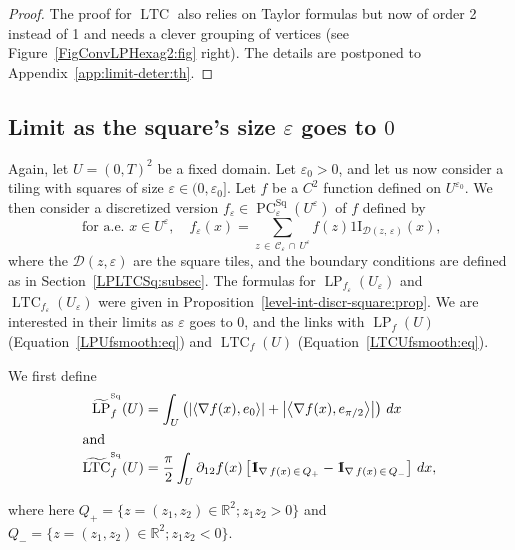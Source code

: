 \documentclass[10pt]{amsart}
\theoremstyle{definition}\newtheorem{defi}[theo]{Definition}\newtheorem{rema}[theo]{Remark}\newtheorem{exam}[theo]{Example}\newtheorem{exem}[theo]{Example}\newtheorem{nota}[theo]{Notation}
\newcommand{\R}{\mathbb{R}}
\newcommand{\ind}{{1\!\!\mathrm{I}}}
\newcommand{\eps}{\varepsilon}
\DeclareMathOperator{\LTC}{LTC}
\DeclareMathOperator{\LP}{LP}
\DeclareMathOperator{\PC}{PC}
\DeclareMathOperator{\Sq}{Sq}
\newcommand{\tLP}{\widetilde{\mathrm{LP}}}
\newcommand{\tLTC}{\widetilde{\mathrm{LTC}}}
\newcommand{\calC}{\mathcal{C}}
\newcommand{\calD}{\mathcal{D}}
\begin{document}
\begin{proof}

The proof for $\LTC$ also relies on Taylor formulas but now of order 2 instead of 1 and needs a clever grouping of vertices (see Figure~\ref{FigConvLPHexag2:fig} right). The details are postponed to Appendix~\ref{app:limit-deter:th}.
\end{proof}

\subsection{Limit as the square's size \texorpdfstring{$\eps$}{eps} goes to \texorpdfstring{$0$}{0}}

Again, let $U=(0,T)^2$ be a fixed domain. Let $\eps_0>0$, and let us now consider a tiling with squares of size $\eps \in (0,\eps_0]$. Let $f$ be a $C^2$ function defined on $U^{\eps_0}$. We then consider a discretized version $f_\eps\in \PC^{\Sq}_\eps(U^{\eps})$ of $f$ defined by
\begin{equation}\label{disc:sq}
\text{ for a.e. } x\in U^{\eps}, \quad f_\varepsilon(x) =\sum_{z\,\in\,\calC_\eps\,\cap\,U^{\eps}} f(z)
\ind_{\calD(z,\,\eps)}(x),
\end{equation}
where the $\calD(z,\eps)$ are the square tiles, and the boundary conditions are defined as in Section~\ref{LPLTCSq:subsec}. The formulas for $\LP_{f_\eps}(U_\eps)$ and $\LTC_{f_\eps}(U_\eps)$ were given in Proposition~\ref{level-int-discr-square:prop}. We are interested in their limits as $\eps$ goes to $0$, and the links with $\LP_f (U)$ (Equation~\eqref{LPUfsmooth:eq}) and $\LTC_f (U)$ (Equation~\eqref{LTCUfsmooth:eq}).

We first define
\begin{align}
\tLP_{f}^{^{\Sq}}(U) &= \int_U \left(\left|\left\langle
\nabla f(x),e_0\right\rangle\right| +\left|\left\langle \nabla f(x),e_{\pi/2}\right\rangle\right| \right) \, dx\label{LPSq}\\
\intertext{and}
\tLTC_{f}^{^{\Sq}}(U) &= \frac{\pi}{2}\int_U \partial_{12}f(x) \left[\ind_{\nabla\,f(x)\,\in\,Q_+}-\ind_{\nabla\,f(x)\,\in\,Q_-}\right] \, dx,\label{LTCSq}
\end{align}

where here $Q_+=\{z=(z_1,z_2)\in\R^2; z_1z_2>0\}$ and $Q_-=\{z=(z_1,z_2)\in\R^2; z_1z_2<0\}$.
\end{document}
